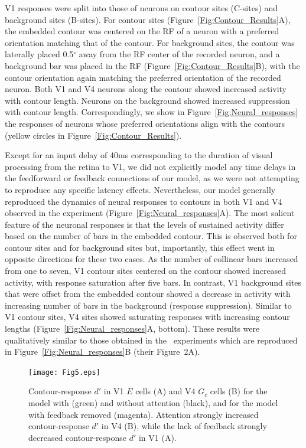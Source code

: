 {V1 responses were split into those of neurons on contour sites
(C-sites) and background sites (B-sites). For contour sites
(Figure~\ref{Fig:Contour_Results}A), the embedded
contour was centered on the RF of a neuron with a preferred
orientation matching that of the contour. For background sites, the
contour was laterally placed 0.5$^{\circ}$ away from the RF center of the recorded neuron, and a background bar was placed in the RF
(Figure~\ref{Fig:Contour_Results}B), with the contour orientation
again matching the preferred orientation of the recorded neuron.
Both V1 and V4 neurons along the contour showed increased activity with contour length. Neurons on the background showed increased suppression with contour length.
%
Correspondingly, we 
 show in Figure~\ref{Fig:Neural_responses} the
responses of neurons whose preferred orientations align with the
contours
 (yellow circles in Figure~\ref{Fig:Contour_Results}).
%

Except for an input delay of 40ms corresponding to the duration of
visual processing from the retina to V1, we did not explicitly model
any time delays in the feedforward or feedback connections of
our model, as we were not attempting to reproduce 
any specific latency effects.
Nevertheless, our model generally reproduced the dynamics of neural
responses to contours in both V1 and V4 observed in the
\cite{Chen_etal14} experiment (Figure~\ref{Fig:Neural_responses}A).
The most salient feature of the neuronal responses is that the levels
of sustained activity differ based on the number of bars in the
embedded contour. This is observed both for contour sites and for
background sites but, importantly, this effect went in opposite
directions for these two cases.  As the number of collinear bars
increased from one to seven, V1 contour sites centered on the contour
showed increased activity, with response saturation after five
bars. In contrast, V1 background sites that were offset from the
embedded contour showed a decrease in activity with increasing number
of bars in the background (response suppression). Similar to V1
contour sites, V4 sites showed saturating responses with increasing
contour lengths (Figure~\ref{Fig:Neural_responses}A, bottom).  These
results were qualitatively similar to those obtained in
the~\cite{Chen_etal14} experiments which are reproduced in
Figure~\ref{Fig:Neural_responses}B (their Figure~2A).
%
\begin{figure}
\begin{center}
\texttt{[image: Fig5.eps]}
\end{center}
\caption{Contour-response $d'$ in V1 $E$ cells (A) and V4 $G_c$ cells (B) for the model with (green) and without attention (black), and for the model with feedback removed 
(magenta). Attention strongly increased
  contour-response $d'$ in V4 (B), while the lack of feedback strongly
  decreased contour-response $d'$ in V1 (A).}
\label{Fig:FB_att}
\end{figure}
%

}

